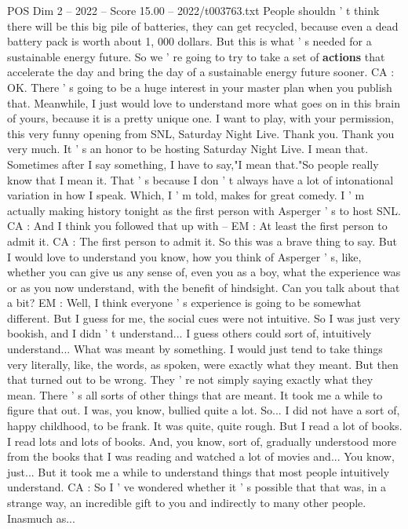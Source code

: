 \begin{textsample}{POS Dim 2 – 2022 – Score 15.00 – 2022/t003763.txt}
People shouldn ' t think there will be this big pile of batteries, they can get recycled, because even a dead battery pack is worth about 1, 000 dollars.
But this is what ' s needed for a sustainable energy future.
So we ' re going to try to take a set of \textbf{actions} that accelerate the day and bring the day of a sustainable energy future sooner.
CA : OK.
There ' s going to be a huge interest in your master plan when you publish that.
Meanwhile, I just would love to understand more what goes on in this brain of yours, because it is a pretty unique one.
I want to play, with your permission, this very funny opening from SNL, Saturday Night Live.
Thank you.
Thank you very much.
It ' s an honor to be hosting Saturday Night Live.
I mean that.
Sometimes after I say something, I have to say,"I mean that."So people really know that I mean it.
That ' s because I don ' t always have a lot of intonational variation in how I speak.
Which, I ' m told, makes for great comedy.
I ' m actually making history tonight as the first person with Asperger ' s to host SNL.
CA : And I think you followed that up with -- EM : At least the first person to admit it.
CA : The first person to admit it.
So this was a brave thing to say.
But I would love to understand you know, how you think of Asperger ' s, like, whether you can give us any sense of, even you as a boy, what the experience was or as you now understand, with the benefit of hindsight.
Can you talk about that a bit?
EM : Well, I think everyone ' s experience is going to be somewhat different.
But I guess for me, the social cues were not intuitive.
So I was just very bookish, and I didn ' t understand...
I guess others could sort of, intuitively understand...
What was meant by something.
I would just tend to take things very literally, like, the words, as spoken, were exactly what they meant.
But then that turned out to be wrong.
They ' re not simply saying exactly what they mean.
There ' s all sorts of other things that are meant.
It took me a while to figure that out.
I was, you know, bullied quite a lot.
So...
I did not have a sort of, happy childhood, to be frank.
It was quite, quite rough.
But I read a lot of books.
I read lots and lots of books.
And, you know, sort of, gradually understood more from the books that I was reading and watched a lot of movies and...
You know, just...
But it took me a while to understand things that most people intuitively understand.
CA : So I ' ve wondered whether it ' s possible that that was, in a strange way, an incredible gift to you and indirectly to many other people.
Inasmuch as...

\end{textsample}
